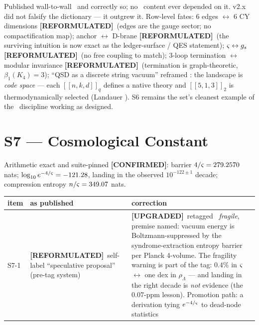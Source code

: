 \documentclass[11pt,a4paper]{article}
\newcommand{\REF}{\textcolor{Icolor}{\textbf{[REFORMULATED]}}}   %
\newcommand{\OK}{\textcolor{Rcolor}{\textbf{[CONFIRMED]}}}       %
\newcommand{\UP}{\textcolor{Cpcolor}{\textbf{[UPGRADED]}}}       %
\begin{document}
Published wall-to-wall \EXPmark\ and correctly so; no \Rmark\ content ever
depended on it. v2.x did not falsify the dictionary --- it outgrew it.
Row-level fates: 6 edges $\leftrightarrow$ 6 CY dimensions \REF\ (edges are
the gauge sector; no compactification map); anchor $\leftrightarrow$
D-brane \REF\ (the surviving intuition is now exact as the ledger-surface /
QES statement); $\varsigma \leftrightarrow g_s$ \REF\ (no free coupling to
match); 3-loop termination $\leftrightarrow$ modular invariance \REF\
(termination is graph-theoretic, $\beta_1(K_4) = 3$); ``QSD as a discrete
string vacuum'' reframed \Omark: the landscape is \emph{code space} ---
each $[\![n,k,d]\!]_q$ defines a native theory and $[\![5,1,3]\!]_2$ is
thermodynamically selected (Landauer \Tmark). S6 remains the set's cleanest
example of the \EXPmark\ discipline working as designed.

\newpage

\section{S7 --- Cosmological Constant}

Arithmetic exact and suite-pinned \OK: barrier $4/\varsigma = 279.2570$ nats;
$\log_{10} e^{-4/\varsigma} = -121.28$, landing in the observed
$10^{-122\pm1}$ decade; compression entropy $n/\varsigma = 349.07$ nats.

\begin{center}
\renewcommand{\arraystretch}{1.45}
\small
\begin{tabular}{@{}p{0.9cm}p{5.2cm}p{7.6cm}@{}}
\toprule
item & as published & correction \\
\midrule
S7-1 & \REF\ self-label ``speculative proposal'' (pre-tag system) & \UP\
retagged \Cpmark\ \emph{fragile}, premise named: vacuum energy is
Boltzmann-suppressed by the syndrome-extraction entropy barrier per Planck
4-volume. The fragility warning is part of the tag: $0.4\%$ in $\varsigma$
$\leftrightarrow$ one dex in $\rho_\Lambda$ --- and landing in the right
decade is \emph{not} evidence (the 0.07-ppm lesson). Promotion path: a
derivation tying $e^{-4/\varsigma}$ to dead-node statistics \Omark \\
\bottomrule
\end{tabular}
\end{center}

\end{document}
